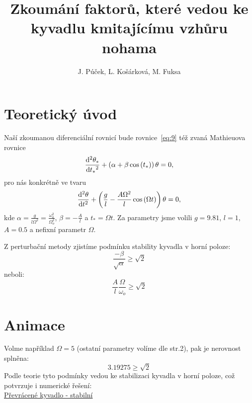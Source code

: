 \documentclass{beamer}
\title[Převrácené kyvadlo]{Zkoumání faktorů, které vedou ke kyvadlu kmitajícímu vzhůru nohama}
\author[J. P., L. K., M. F.]{J. Púček, L. Košárková, M. Fuksa}
\institute[Univerzita Karlova]{Univerzita Karlova, Česká republika}
\date{}
\begin{document}
\begin{frame}
\titlepage
\end{frame}

\section{Teoretický úvod}
\label{sec:uvod}

\begin{frame}
\begin{center}
			Naší zkoumanou diferenciální rovnicí bude rovnice~\eqref{eq:9} též zvaná Mathieuova rovnice
		\begin{equation}
			\label{eq:9}
			\frac{\mathrm{d}^2 {\theta_{*}}}{\mathrm{d} {t_{*}}^2}
			+
			\left(
			\alpha
			+
			\beta \cos \left( t_{*} \right)
			\right)
			\theta
			=
			0
			,
		\end{equation}
			pro nás konkrétně ve tvaru
		\begin{equation}
			\label{eq:10}
			\frac{\mathrm{d}^2 {\theta}}{\mathrm{d} {t}^2}
			+
			\left(
			\frac{g}{l}
			-
			\frac{A \Omega^2}{l} \cos \left( \Omega t \right)
			\right)
			\theta
			=
			0
			,
		\end{equation}
			kde $\alpha=\frac{g}{l\Omega^2}=\frac{\omega_{o}^2}{\Omega_{o}^2}$, $ \beta=-\frac{A}{l}$ a $t_{*}=\Omega t$. Za parametry jsme volili $g=9.81$, $l=1$,  $A=0.5$ a nefixní parametr $\Omega$.
		\end{center}
\end{frame}

\begin{frame}
	\begin{center}
	Z perturbační metody zjistíme podmínku stability kyvadla v horní poloze: 
	\begin{equation*}
		\frac{-\beta}{\sqrt{\alpha}}\geq \sqrt{2}
	\end{equation*}
	neboli:
	\begin{equation*}
	\frac{A}{l}\frac{\Omega}{\omega_{o}}\geq \sqrt{2}
	\end{equation*}	
	\end{center}
\end{frame}

\section{Animace}
\label{sec:animace}

\begin{frame}
\begin{center}
	Volme například $\Omega=5$ (ostatní parametry volíme dle str.2), pak je nerovnost splněna:
\begin{equation*}
	3.19275 \geq \sqrt{2}
\end{equation*}	
	Podle teorie tyto podmínky vedou ke stabilizaci kyvadla v horní poloze, což potvrzuje i numerické řešení: 
\\

\href{run:./animace.mp4}{Převrácené kyvadlo - stabilní}
\end{center}
\end{frame}
\end{document}
